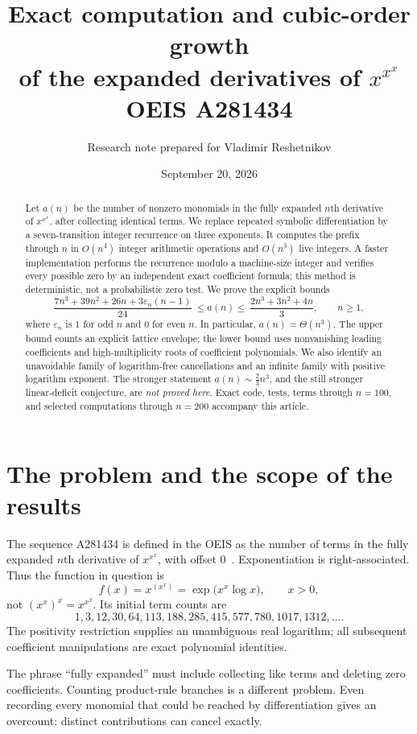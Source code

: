 \documentclass[11pt]{article}
\title{\textbf{Exact computation and cubic-order growth\\of the expanded derivatives of $x^{x^x}$}\\[5pt]
\large OEIS A281434}
\author{Research note prepared for Vladimir Reshetnikov}
\date{September 20, 2026}
\numberwithin{equation}{section}
\theoremstyle{definition}
\theoremstyle{remark}
\newcommand{\epsn}{\varepsilon_n}
\begin{document}
\maketitle
\begin{abstract}
Let $a(n)$ be the number of nonzero monomials in the fully expanded $n$th
 derivative of $x^{x^x}$, after collecting identical terms. We replace repeated
 symbolic differentiation by a seven-transition integer recurrence on three
 exponents. It computes the prefix through $n$ in $O(n^4)$ integer arithmetic
 operations and $O(n^3)$ live integers. A faster implementation performs the
 recurrence modulo a machine-size integer and verifies every possible zero
 by an independent exact coefficient formula; this method is deterministic,
 not a probabilistic zero test. We prove the explicit bounds
\[
 \frac{7n^3+39n^2+26n+3\epsn(n-1)}{24}
 \ \le a(n)\le\ \frac{2n^3+3n^2+4n}{3},\qquad n\ge1,
\]
where $\epsn$ is $1$ for odd $n$ and $0$ for even $n$. In particular,
$a(n)=\Theta(n^3)$. The upper bound counts an explicit lattice envelope;
the lower bound uses nonvanishing leading coefficients and high-multiplicity
roots of coefficient polynomials. We also identify an unavoidable family of
logarithm-free cancellations and an infinite family with positive logarithm
exponent. The stronger statement $a(n)\sim \tfrac23n^3$, and the still stronger
linear-deficit conjecture, are \emph{not proved here}. Exact code, tests,
terms through $n=100$, and selected computations through $n=200$ accompany
this article.
\end{abstract}

\clearpage
\tableofcontents
\clearpage

\section{The problem and the scope of the results}

The sequence A281434 is defined in the OEIS as the number of terms in the fully
expanded $n$th derivative of $x^{x^x}$, with offset $0$~\cite{oeis281434}.
Exponentiation is right-associated. Thus the function in question is
\[
 f(x)=x^{(x^x)}=\exp\bigl(x^x\log x\bigr),\qquad x>0,
\]
not $(x^x)^x=x^{x^2}$. Its initial term counts are
\[
1,3,12,30,64,113,188,285,415,577,780,1017,1312,\ldots.
\]
The positivity restriction supplies an unambiguous real logarithm; all
subsequent coefficient manipulations are exact polynomial identities.

The phrase ``fully expanded'' must include collecting like terms and deleting
zero coefficients. Counting product-rule branches is a different problem.
Even recording every monomial that could be reached by differentiation gives
an overcount: distinct contributions can cancel exactly.
\end{document}
